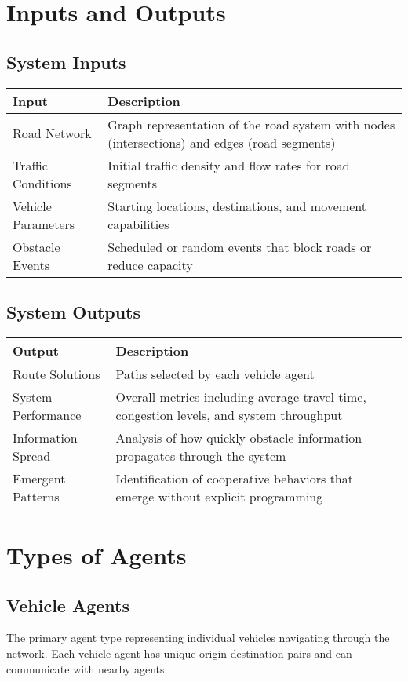 \documentclass[a4paper, 11pt]{article}
\begin{document}
\section{Inputs and Outputs}
\subsection{System Inputs}
\begin{tabularx}{\textwidth}{|X|X|}
\hline
\textbf{Input} & \textbf{Description} \\
\hline
Road Network & Graph representation of the road system with nodes (intersections) and edges (road segments) \\
\hline
Traffic Conditions & Initial traffic density and flow rates for road segments \\
\hline
Vehicle Parameters & Starting locations, destinations, and movement capabilities \\
\hline
Obstacle Events & Scheduled or random events that block roads or reduce capacity \\
\hline
\end{tabularx}

\subsection{System Outputs}
\begin{tabularx}{\textwidth}{|X|X|}
\hline
\textbf{Output} & \textbf{Description} \\
\hline
Route Solutions & Paths selected by each vehicle agent \\
\hline
System Performance & Overall metrics including average travel time, congestion levels, and system throughput \\
\hline
Information Spread & Analysis of how quickly obstacle information propagates through the system \\
\hline
Emergent Patterns & Identification of cooperative behaviors that emerge without explicit programming \\
\hline
\end{tabularx}

\section{Types of Agents}
\subsection{Vehicle Agents}
The primary agent type representing individual vehicles navigating through the network. Each vehicle agent has unique origin-destination pairs and can communicate with nearby agents.
\end{document}
